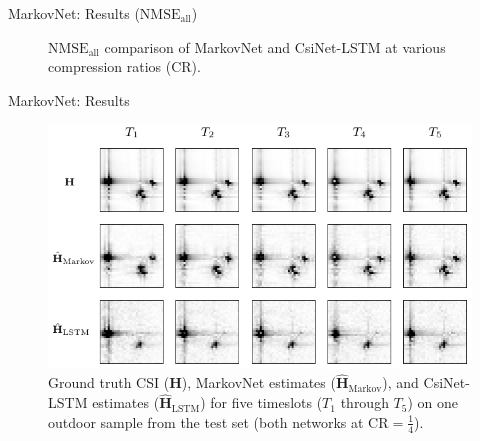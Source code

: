 \documentclass{beamer}
\begin{document}
  \begin{frame}{MarkovNet: Results ($\text{NMSE}_{\text{all}}$)}
    \begin{figure}[!hbtp] \centering 
      \vspace*{-3mm}
      \caption{$\text{NMSE}_{\text{all}}$ comparison of MarkovNet and CsiNet-LSTM 
      at various compression ratios (CR).} 
      \label{fig:diffnet_result} \vspace*{-2mm}
    \end{figure}  
  \end{frame}


  \begin{frame}{MarkovNet: Results}
    \begin{figure}[htb] \centering 
      \includegraphics[width=0.9\linewidth]{batch0_csi_compare_cr512.pdf}
      \caption{Ground truth CSI ($\mathbf H$), MarkovNet estimates ($\hat{\mathbf H}_{\text{Markov}}$), and CsiNet-LSTM estimates ($\hat{\mathbf H}_{\text{LSTM}}$) for five timeslots ($T_1$ through $T_5$) on one outdoor sample from the test set (both networks at $\text{CR}=\frac 14$).} 
      \label{fig:csi_img_compare} 
    \end{figure}
  \end{frame}
\end{document}
